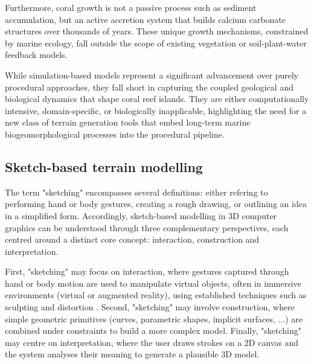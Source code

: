 Furthermore, coral growth is not a passive process such as sediment accumulation, but an active accretion system that builds calcium carbonate structures over thousands of years. These unique growth mechanisms, constrained by marine ecology, fall outside the scope of existing vegetation or soil-plant-water feedback models.

\midConclusion

While simulation-based models represent a significant advancement over purely procedural approaches, they fall short in capturing the coupled geological and biological dynamics that shape coral reef islands. They are either computationally intensive, domain-specific, or biologically inapplicable, highlighting the need for a new class of terrain generation tools that embed long-term marine biogeomorphological processes into the procedural pipeline.







\subsection{Sketch-based terrain modelling}
\label{sec:coral-island-sota-sketches}

The term "sketching" encompasses several definitions: either refering to performing hand or body gestures, creating a rough drawing, or outlining an idea in a simplified form. Accordingly, sketch-based modelling in 3D computer graphics can be understood through three complementary perspectives, each centred around a distinct core concept: interaction, construction and interpretation.

First, "sketching" may focus on interaction, where gestures captured through hand or body motion are used to manipulate virtual objects, often in immersive environments (virtual or augmented reality), using established techniques such as sculpting and distortion \cite{Olsen2009, Cook2009}. Second, "sketching" may involve construction, where simple geometric primitives (curves, parametric shapes, implicit surfaces, ...) are combined under constraints to build a more complex model. Finally, "sketching" may centre on interpretation, where the user draws strokes on a 2D canvas and the system analyses their meaning to generate a plausible 3D model.

